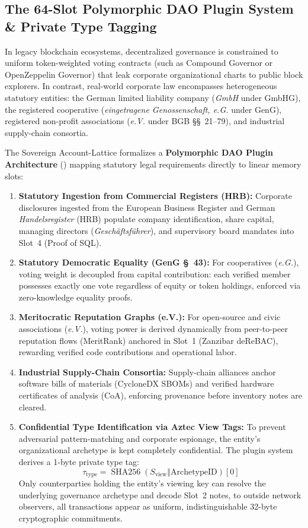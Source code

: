\documentclass[a4paper,11pt,twoside,parskip=half-,headings=small]{scrartcl}
\begin{document}
\subsection{The 64-Slot Polymorphic DAO Plugin System \& Private Type Tagging}
\label{sec:polymorphic_dao_plugins}

In legacy blockchain ecosystems, decentralized governance is constrained to uniform token-weighted voting contracts (such as Compound Governor or OpenZeppelin Governor) that leak corporate organizational charts to public block explorers. In contrast, real-world corporate law encompasses heterogeneous statutory entities: the German limited liability company (\emph{GmbH} under GmbHG), the registered cooperative (\emph{eingetragene Genossenschaft, e.G.} under GenG), registered non-profit associations (\emph{e.V.} under BGB \S\S~21--79), and industrial supply-chain consortia.

The Sovereign Account-Lattice formalizes a \textbf{Polymorphic DAO Plugin Architecture} () mapping statutory legal requirements directly to linear memory slots:
\begin{enumerate}
  \item \textbf{Statutory Ingestion from Commercial Registers (HRB):} Corporate disclosures ingested from the European Business Register and German \emph{Handelsregister} (HRB) populate company identification, share capital, managing directors (\emph{Gesch\"aftsf\"uhrer}), and supervisory board mandates into Slot~4 (Proof of SQL).
  \item \textbf{Statutory Democratic Equality (GenG \S~43):} For cooperatives (\emph{e.G.}), voting weight is decoupled from capital contribution: each verified member possesses exactly one vote regardless of equity or token holdings, enforced via zero-knowledge equality proofs.
  \item \textbf{Meritocratic Reputation Graphs (e.V.):} For open-source and civic associations (\emph{e.V.}), voting power is derived dynamically from peer-to-peer reputation flows (MeritRank) anchored in Slot~1 (Zanzibar deReBAC), rewarding verified code contributions and operational labor.
  \item \textbf{Industrial Supply-Chain Consortia:} Supply-chain alliances anchor software bills of materials (CycloneDX SBOMs) and verified hardware certificates of analysis (CoA), enforcing provenance before inventory notes are cleared.
  \item \textbf{Confidential Type Identification via Aztec View Tags:} To prevent adversarial pattern-matching and corporate espionage, the entity's organizational archetype is kept completely confidential. The plugin system derives a 1-byte private type tag:
  \begin{equation}
    \tau_{\text{type}} = \operatorname{SHA256}(S_{\text{view}} \mathbin{\Vert} \text{ArchetypeID})[0]
  \end{equation}
  Only counterparties holding the entity's viewing key can resolve the underlying governance archetype and decode Slot~2 notes, to outside network observers, all transactions appear as uniform, indistinguishable 32-byte cryptographic commitments.
\end{enumerate}
\end{document}
